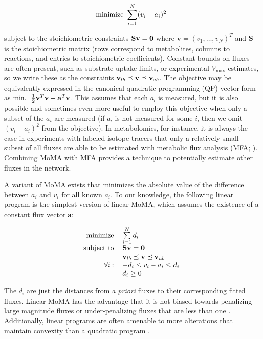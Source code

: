 \begin{equation}
\centering
\textnormal{minimize}\ \sum\limits_{i=1}^N (v_i-a_i)^2 
\end{equation}

subject to the stoichiometric constraints $\mathbf{S v}\nolinebreak
=\nolinebreak \mathbf{0}$ where $\mathbf{v} = (v_1, \ldots,
v_N)^T$ and $\mathbf{S}$ is the stoichiometric matrix (rows correspond
to metabolites, columns to reactions, and entries to stoichiometric
coefficients). Constant bounds on fluxes are often present, such as
substrate uptake limits, or experimental $V_{\max}$ estimates, so we
write these as the constraints $\mathbf{v}_{lb}\nolinebreak
\preceq\nolinebreak \mathbf{v}\nolinebreak \preceq \mathbf{v}_{ub}$.
The objective may be equivalently expressed in the canonical
quadratic programming (QP) vector form as
$\textnormal{min.\ }\ \frac{1}{2}\mathbf{v}^T \mathbf{v}\nolinebreak
-\nolinebreak \mathbf{a}^T \mathbf{v}$. This assumes that each $a_i$
is measured, but it is also possible and sometimes even more useful to
employ this objective when only a subset of the $a_i$ are measured (if
$a_i$ is not measured for some $i$, then we omit $(v_i-a_i)^2$ from
the objective). In metabolomics, for instance, it is always the case
in experiments with labeled isotope tracers that only a relatively
small subset of all fluxes are able to be estimated with metabolic
flux analysis (MFA; \citealt{Shestov2013a}). Combining MoMA with MFA
provides a technique to potentially estimate other fluxes in the
network.

A variant of MoMA exists that minimizes the absolute value of the
difference between $a_i$ and $v_i$ for all known $a_i$. To our
knowledge, the following linear program is the simplest version of
linear MoMA, which assumes the existence of a constant flux vector
$\mathbf{a}$:

\begin{equation}
\centering
\begin{tabular}{rl}
minimize & $\sum\limits_{i=1}^N d_i$  \\
subject to & $\mathbf{S v} = \mathbf{0}$ \\
 & $\mathbf{v}_{lb} \preceq \mathbf{v} \preceq \mathbf{v}_{ub}$ \\
$\forall i:$ & $-d_i \le v_i-a_i \le d_i$ \\
 & $d_i \ge 0$
\end{tabular}
\end{equation}

The $d_i$ are just the distances from \textit{a priori} fluxes to
their corresponding fitted fluxes.  Linear MoMA has the advantage that
it is not biased towards penalizing large magnitude fluxes or
under-penalizing fluxes that are less than one
\citep{Boyd2004,Shlomi2005}. Additionally, linear programs are often
amenable to more alterations that maintain convexity than a quadratic
program \citep{Boyd2004}.

